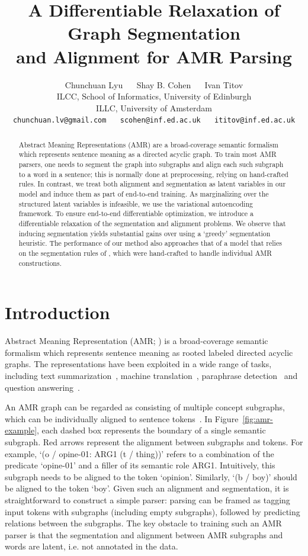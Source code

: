 \documentclass[11pt]{article}
\title{A Differentiable Relaxation of Graph Segmentation \\  and Alignment  for AMR Parsing}
\author{ {Chunchuan Lyu}  ~~ {Shay B. Cohen} ~~ {Ivan Titov} 
 \smallskip \\
       {ILCC, School of Informatics, University of Edinburgh}  \\
     {ILLC, University of Amsterdam}
 \smallskip \\
 {\tt chunchuan.lv@gmail.com} ~~ {\tt scohen@inf.ed.ac.uk} ~~ {\tt ititov@inf.ed.ac.uk}  \\
}
\date{}
\begin{document}
\setlength{\abovedisplayskip}{1pt}
\setlength{\belowdisplayskip}{1pt}
\setlength{\abovedisplayshortskip}{1pt}
\setlength{\belowdisplayshortskip}{1pt}
\maketitle
\begin{abstract}
Abstract Meaning Representations (AMR) are a broad-coverage semantic formalism which represents sentence meaning as a directed acyclic graph. To train most AMR parsers, one needs to segment the graph into subgraphs and align each such subgraph to a word in a sentence; this is normally done at preprocessing, relying on hand-crafted rules. In contrast, we treat both alignment and segmentation as latent variables in our model and induce them as part of end-to-end training.
 As marginalizing over the structured latent variables is infeasible, we use the variational autoencoding framework. 
 To ensure end-to-end differentiable optimization, we introduce a differentiable relaxation of the segmentation and alignment problems.
We observe that inducing segmentation yields substantial gains over using a `greedy' segmentation heuristic. The performance of our method also approaches that of a model that relies on the segmentation rules of \citet{lyu-titov-2018-amr}, which were hand-crafted to handle individual AMR constructions.
\end{abstract}


\section{Introduction}

Abstract Meaning Representation (AMR; \citealt{Banarescu13abstractmeaning}) is a broad-coverage semantic formalism which represents sentence meaning as rooted labeled directed acyclic graphs. 
The representations have been exploited in a wide range of tasks, including text summarization~\cite{Liu2015TowardAS,dohare2017text,Hardy2018GuidedNL}, machine translation~\cite{Jones2012SemanticsBasedMT,Song2019SemanticNM}, paraphrase detection~\cite{Issa2018AbstractMR} and question answering~\cite{Mitra2016AddressingAQ}. 

An AMR graph can be regarded as consisting of 
multiple concept subgraphs, which can be individually
aligned to sentence tokens~\cite{Flanigan2014ADG}.  
 In Figure~\ref{fig:amr-example}, each dashed box represents the boundary of a single semantic subgraph. Red arrows represent the alignment between subgraphs and tokens.
 For example, `(o / opine-01: ARG1 (t / thing))' refers to a combination of the predicate `opine-01' and a filler of its semantic role ARG1.  Intuitively, this subgraph needs to be aligned to the token `opinion'. Similarly, `(b / boy)' should be aligned to the token `boy'. Given such an alignment and segmentation, it is straightforward to construct a simple  parser: parsing can be framed as tagging input tokens with subgraphs (including empty subgraphs), followed by predicting relations between the subgraphs. The key obstacle to training such an AMR parser is that the segmentation
 and alignment between AMR subgraphs and words are latent, i.e. not annotated in the data.
 
\end{document}

